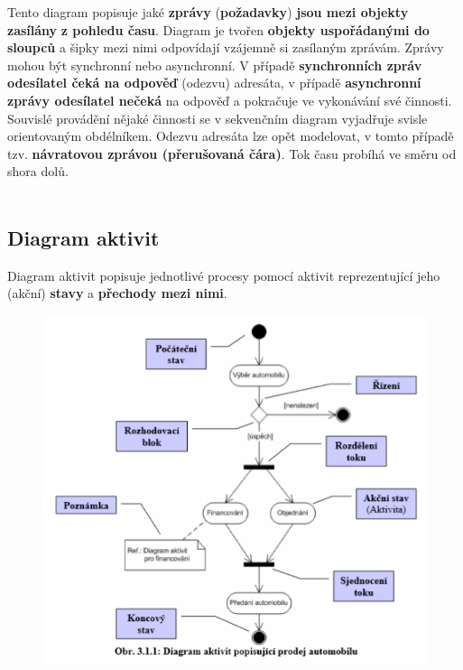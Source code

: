 Tento diagram popisuje jaké \textbf{zprávy} (\textbf{požadavky}) \textbf{jsou mezi objekty zasílány} \textbf{z pohledu času}. Diagram je tvořen \textbf{objekty uspořádanými do sloupců} a šipky mezi nimi odpovídají {vzájemně si zasílaným zprávám}. Zprávy mohou být {synchronní} nebo {asynchronní}. V případě \textbf{synchronních zpráv odesílatel čeká na odpověď} (odezvu) adresáta, v případě \textbf{asynchronní zprávy odesílatel nečeká} na odpověď a pokračuje ve vykonávání své činnosti. Souvislé provádění nějaké činnosti se v sekvenčním diagram vyjadřuje svisle orientovaným obdélníkem. Odezvu adresáta lze opět modelovat, v tomto případě tzv. \textbf{návratovou zprávou (přerušovaná čára)}. Tok času probíhá ve směru od shora dolů.
\\\\
\noindent{}

\subsection{Diagram aktivit}
Diagram aktivit popisuje jednotlivé procesy pomocí aktivit reprezentující jeho (akční) \textbf{stavy} a \textbf{přechody mezi nimi}.

\begin{figure}[H]
	\centering
	\includegraphics[width=1\textwidth]{assets/diag_aktivit.png}
\end{figure}
